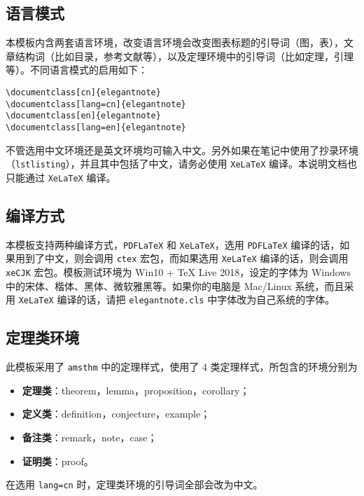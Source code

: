 \documentclass[cn,pad,11pt,green,geye]{../elegantnote}
\begin{document}
\subsection{语言模式}
本模板内含两套语言环境，改变语言环境会改变图表标题的引导词（图，表），文章结构词（比如目录，参考文献等），以及定理环境中的引导词（比如定理，引理等）。不同语言模式的启用如下：
\begin{lstlisting}[frame=none]  
\documentclass[cn]{elegantnote} 
\documentclass[lang=cn]{elegantnote}
\documentclass[en]{elegantnote} 
\documentclass[lang=en]{elegantnote}
\end{lstlisting}
\begin{note}
不管选用中文环境还是英文环境均可输入中文。另外如果在笔记中使用了抄录环境（\lstinline{lstlisting}），并且其中包括了中文，请务必使用 \lstinline{XeLaTeX} 编译。本说明文档也只能通过 \lstinline{XeLaTeX} 编译。
\end{note}

\subsection{编译方式}

本模板支持两种编译方式，\lstinline{PDFLaTeX} 和 \lstinline{XeLaTeX}，选用 \lstinline{PDFLaTeX} 编译的话，如果用到了中文，则会调用 \lstinline{ctex} 宏包，而如果选用 \lstinline{XeLaTeX} 编译的话，则会调用 \lstinline{xeCJK} 宏包。模板测试环境为 Win10 + \TeX{} Live 2018，设定的字体为 Windows 中的宋体、楷体、黑体、微软雅黑等。如果你的电脑是 Mac/Linux 系统，而且采用 \lstinline{XeLaTeX} 编译的话，请把 \lstinline{elegantnote.cls} 中字体改为自己系统的字体。

\subsection{定理类环境}
此模板采用了 \lstinline{amsthm} 中的定理样式，使用了 4 类定理样式，所包含的环境分别为
\begin{itemize}
\item \textbf{定理类}：theorem，lemma，proposition，corollary；
\item \textbf{定义类}：definition，conjecture，example；
\item \textbf{备注类}：remark，note，case；
\item \textbf{证明类}：proof。
\end{itemize}

\begin{remark}
在选用 \lstinline{lang=cn} 时，定理类环境的引导词全部会改为中文。
\end{remark}
\end{document}
